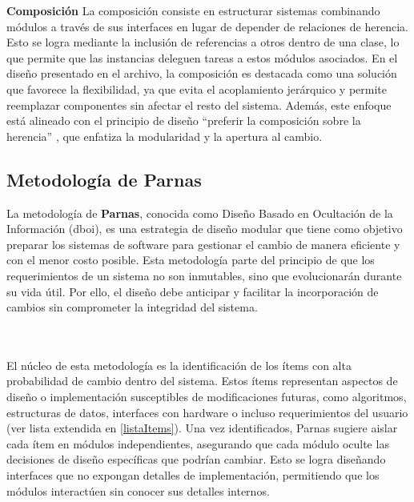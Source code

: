 \textbf{Composición}
La composición consiste en estructurar sistemas combinando módulos a través de sus interfaces en lugar de depender de relaciones de herencia. Esto se logra mediante la inclusión de referencias a otros dentro de una clase, lo que permite que las instancias deleguen tareas a estos módulos asociados. En el diseño presentado en el archivo, la composición es destacada como una solución que favorece la flexibilidad, ya que evita el acoplamiento jerárquico y permite reemplazar componentes sin afectar el resto del sistema. Además, este enfoque está alineado con el principio de diseño ``preferir la composición sobre la herencia'' \cite{Gamma:1995:DPE:186897}, que enfatiza la modularidad y la apertura al cambio.



\subsection{Metodología de Parnas}
\label{metoParnas}

La metodología de \textbf{Parnas}\cite{Parnas1972}, conocida como Diseño Basado en Ocultación de la Información (\gls{dboi}), es una estrategia de diseño modular que tiene como objetivo preparar los sistemas de software para gestionar el cambio de manera eficiente y con el menor costo posible. Esta metodología parte del principio de que los requerimientos de un sistema no son inmutables, sino que evolucionarán durante su vida útil. Por ello, el diseño debe anticipar y facilitar la incorporación de cambios sin comprometer la integridad del sistema.

\noindent{} 
\\\\
\indent
El núcleo de esta metodología es la identificación de los ítems con alta probabilidad de cambio dentro del sistema. Estos ítems representan aspectos de diseño o implementación susceptibles de modificaciones futuras, como algoritmos, estructuras de datos, interfaces con hardware o incluso requerimientos del usuario (ver lista extendida en \ref{listaItems}). Una vez identificados, Parnas sugiere aislar cada ítem en módulos independientes, asegurando que cada módulo oculte las decisiones de diseño específicas que podrían cambiar. Esto se logra diseñando interfaces que no expongan detalles de implementación, permitiendo que los módulos interactúen sin conocer sus detalles internos.

